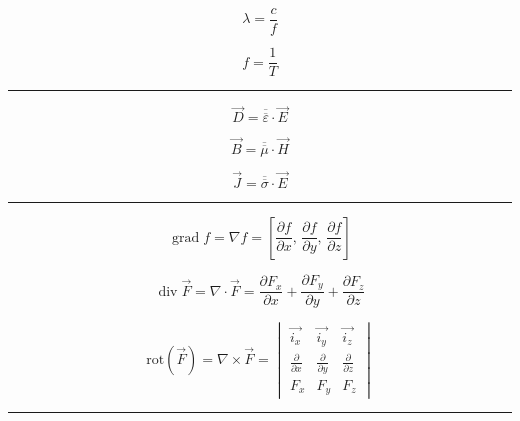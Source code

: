 \documentclass[12pt]{article}
\newcommand{\grayrule}{{\color{lightgray} \hrule}}
\begin{document}

\begin{multicols}{3}

\begin{equation*}
    \lambda = \frac{c}{f}
\end{equation*}

\begin{equation*}
    f = \frac{1}{T}
\end{equation*}

\grayrule

\begin{equation*}
    \Vec{D} = \overline{\overline{\varepsilon}} \cdot \Vec{E}
\end{equation*}

\begin{equation*}
    \Vec{B} = \overline{\overline{\mu}} \cdot \Vec{H}
\end{equation*}

\begin{equation*}
    \Vec{J} = \overline{\overline{\sigma}} \cdot \Vec{E}
\end{equation*}

\grayrule

\begin{equation*}
    \operatorname{grad} f = \nabla f = \left[
            \frac{\partial f}{\partial x},\,
            \frac{\partial f}{\partial y},\,
            \frac{\partial f}{\partial z}
    \right]
\end{equation*}

\begin{equation*}
    \operatorname{div} \Vec{F}
        = \nabla \cdot \Vec{F}
        = \frac{\partial F_x}{\partial x}
            + \frac{\partial F_y}{\partial y}
            + \frac{\partial F_z}{\partial z}
\end{equation*}

\begin{equation*}
    \mathrm{rot}(\Vec{F}) = \nabla \times \Vec{F}
        = \begin{vmatrix}
        \Vec{i_x} & \Vec{i_y} & \Vec{i_z} \\
        \frac{\partial}{\partial x} & \frac{\partial}{\partial y} & \frac{\partial}{\partial z} \\
        F_x & F_y & F_z
        \end{vmatrix}
\end{equation*}

\grayrule


\end{multicols}
\end{document}
